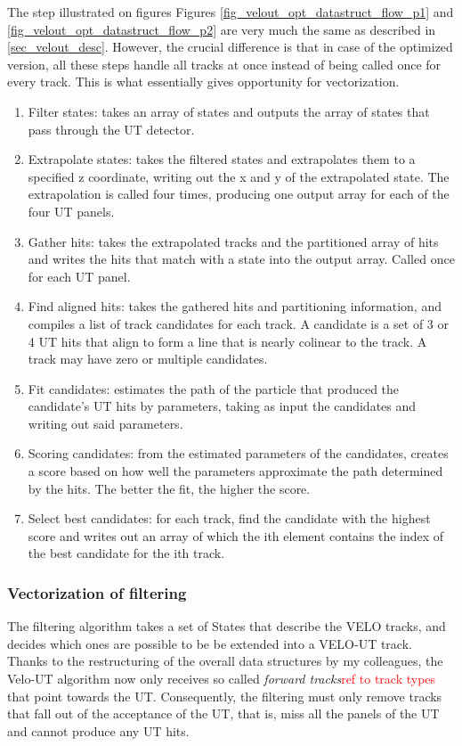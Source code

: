 \documentclass[12pt]{article}
\begin{document}
The step illustrated on figures Figures \ref{fig_velout_opt_datastruct_flow_p1} and \ref{fig_velout_opt_datastruct_flow_p2} are very much the same as described in \ref{sec_velout_desc}. However, the crucial difference is that in case of the optimized version, all these steps handle all tracks at once instead of being called once for every track. This is what essentially gives opportunity for vectorization.

\begin{enumerate}
	\item Filter states: takes an array of states and outputs the array of states that pass through the UT detector.
	\item Extrapolate states: takes the filtered states and extrapolates them to a specified z coordinate, writing out the x and y of the extrapolated state. The extrapolation is called four times, producing one output array for each of the four UT panels.
	\item Gather hits: takes the extrapolated tracks and the partitioned array of hits and writes the hits that match with a state into the output array. Called once for each UT panel.
	\item Find aligned hits: takes the gathered hits and partitioning information, and compiles a list of track candidates for each track. A candidate is a set of 3 or 4 UT hits that align to form a line that is nearly colinear to the track. A track may have zero or multiple candidates.
	\item Fit candidates: estimates the path of the particle that produced the candidate's UT hits by parameters, taking as input the candidates and writing out said parameters.
	\item Scoring candidates: from the estimated parameters of the candidates, creates a score based on how well the parameters approximate the path determined by the hits. The better the fit, the higher the score.
	\item Select best candidates: for each track, find the candidate with the highest score and writes out an array of which the ith element contains the index of the best candidate for the ith track.
\end{enumerate}


\subsubsection{Vectorization of filtering}\label{sec_velout_filtering_vect}

The filtering algorithm takes a set of States that describe the VELO tracks, and decides which ones are possible to be be extended into a VELO-UT track. Thanks to the restructuring of the overall data structures by my colleagues, the Velo-UT algorithm now only receives so called \textit{forward tracks}\textcolor{red}{ref to track types} that point towards the UT. Consequently, the filtering must only remove tracks that fall out of the acceptance of the UT, that is, miss all the panels of the UT and cannot produce any UT hits.
\end{document}
